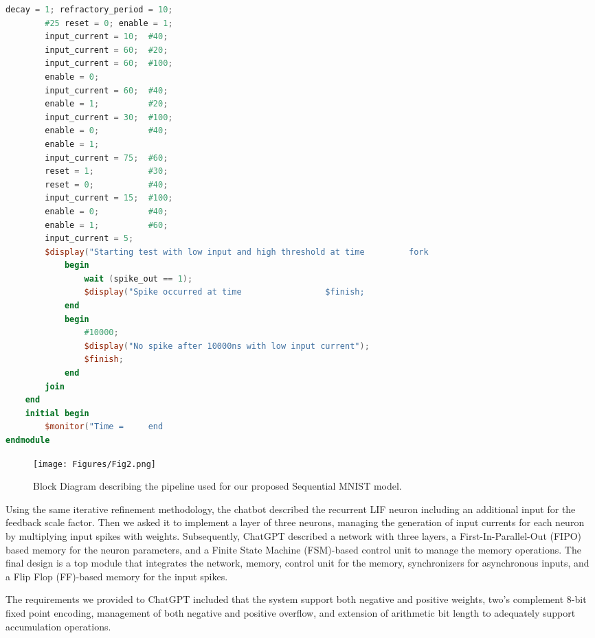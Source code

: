 \begin{table*}[!htbp]
\begin{minipage}[t]{.49\textwidth}
\begin{lstlisting}[language=Verilog, caption={Final Module}]
        decay = 1; refractory_period = 10;
        #25 reset = 0; enable = 1;
        input_current = 10;  #40;
        input_current = 60;  #20;
        input_current = 60;  #100;
        enable = 0;
        input_current = 60;  #40;
        enable = 1;          #20;
        input_current = 30;  #100;
        enable = 0;          #40;
        enable = 1;
        input_current = 75;  #60;
        reset = 1;           #30;
        reset = 0;           #40;
        input_current = 15;  #100;
        enable = 0;          #40;
        enable = 1;          #60;
        input_current = 5;
        $display("Starting test with low input and high threshold at time         fork
            begin
                wait (spike_out == 1);
                $display("Spike occurred at time                 $finish;
            end
            begin
                #10000;
                $display("No spike after 10000ns with low input current");
                $finish;
            end
        join
    end
    initial begin
        $monitor("Time =     end
endmodule

\end{lstlisting}
\end{minipage}

\end{table*}



\begin{figure*}[htbp]
\centerline{\texttt{[image: Figures/Fig2.png]}}
\caption{Block Diagram describing the pipeline used for our proposed Sequential MNIST model.}
\label{fig:neural1}
\end{figure*}



Using the same iterative refinement methodology, the chatbot described the recurrent LIF neuron including an additional input for the feedback scale factor. 
Then we asked it to implement a layer of three neurons, managing the generation of input currents for each neuron by multiplying input spikes with weights.
Subsequently, ChatGPT described a network with three layers, a First-In-Parallel-Out (FIPO) based memory for the neuron parameters, and a Finite State Machine (FSM)-based control unit to manage the memory operations.
The final design is a top module that integrates the network, memory, control unit for the memory, synchronizers for asynchronous inputs, and a Flip Flop (FF)-based memory for the input spikes.

The requirements we provided to ChatGPT included that the system support both negative and positive weights, two's complement 8-bit fixed point encoding, management of both negative and positive overflow, and extension of arithmetic bit length to adequately support accumulation operations.





